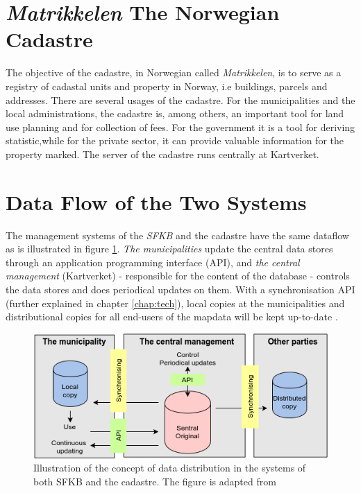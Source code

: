 
\section{\textit{Matrikkelen} The Norwegian Cadastre}\label{cadastre}

The objective of the cadastre, in Norwegian called \textit{Matrikkelen}, is to serve as a registry of cadastal units and property in Norway, i.e buildings, parcels and addresses. There are several usages of  the cadastre. For the municipalities and the local administrations, the cadastre is, among others, an important tool for land use planning and for collection of fees. For the government it is a tool for deriving statistic,while for the private sector, it can provide valuable information for the property marked\citep{Mjos2002}. The server of the cadastre runs centrally at Kartverket.  


\section{Data Flow of the Two Systems}
The management systems of the \textit{SFKB} and the cadastre have the same dataflow as is illustrated in figure \ref{fig:konsept}. \textit{The municipalities}  update the central data stores through an application programming interface (API), and \textit{the central management} (Kartverket) 	- responsible for the content of the database - controls the data stores and does periodical updates on them. With a synchronisation API (further explained in chapter \ref{chap:tech}), local copies at the municipalities and distributional copies for all end-users of the mapdata will be kept up-to-date \citep{Kartverket2015}.


\begin{figure}[H]
	\centering
	\includegraphics[scale=0.8]{img/consept.png}
	\caption{Illustration of the concept of data distribution in the systems of both SFKB and the cadastre. The figure is adapted from \cite{Kartverket2015} }
	\label{fig:konsept}
\end{figure}


